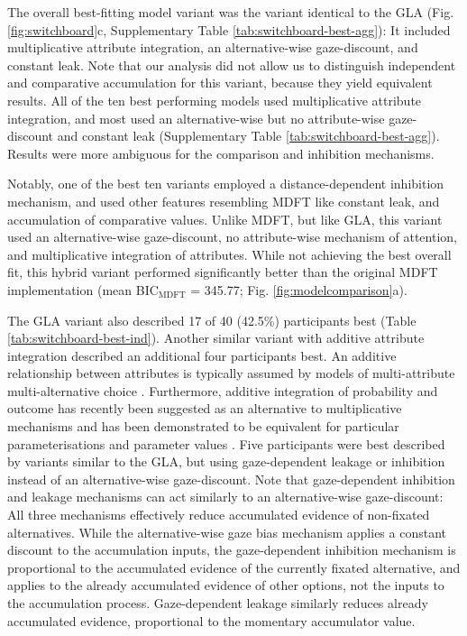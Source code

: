 \documentclass[11pt, a4paper]{article}
\begin{document}
The overall best-fitting model variant was the variant identical to the GLA (Fig. \ref{fig:switchboard}c, Supplementary Table \ref{tab:switchboard-best-agg}): It included multiplicative attribute integration, an alternative-wise gaze-discount, and constant leak. Note that our analysis did not allow us to distinguish independent and comparative accumulation for this variant, because they yield equivalent results. All of the ten best performing models used multiplicative attribute integration, and most used an alternative-wise but no attribute-wise gaze-discount and constant leak (Supplementary Table \ref{tab:switchboard-best-agg}). Results were more ambiguous for the comparison and inhibition mechanisms.

Notably, one of the best ten variants employed a distance-dependent inhibition mechanism, and used other features resembling MDFT like constant leak, and accumulation of comparative values. Unlike MDFT, but like GLA, this variant used an alternative-wise gaze-discount, no attribute-wise mechanism of attention, and multiplicative integration of attributes. While not achieving the best overall fit, this hybrid variant performed significantly better than the original MDFT implementation (mean BIC$_{\text{MDFT}}$ = 345.77; Fig. \ref{fig:modelcomparison}a).

The GLA variant also described 17 of 40 (42.5\%) participants best (Table \ref{tab:switchboard-best-ind}). Another similar variant with additive attribute integration described an additional four participants best. An additive relationship between attributes is typically assumed by models of multi-attribute multi-alternative choice \parencite[e.g.,][]{roe2001MultialternativeDecisionField,usher2004LossAversionInhibition}. Furthermore, additive integration of probability and outcome has recently been suggested as an alternative to multiplicative mechanisms and has been demonstrated to be equivalent for particular parameterisations and parameter values \parencite{rouault2019PrefrontalMechanismsCombining}. Five participants were best described by variants similar to the GLA, but using gaze-dependent leakage or inhibition instead of an alternative-wise gaze-discount. Note that gaze-dependent inhibition and leakage mechanisms can act similarly to an alternative-wise gaze-discount: All three mechanisms effectively reduce accumulated evidence of non-fixated alternatives. While the alternative-wise gaze bias mechanism applies a constant discount to the accumulation inputs, the gaze-dependent inhibition mechanism is proportional to the accumulated evidence of the currently fixated alternative, and applies to the already accumulated evidence of other options, not the inputs to the accumulation process. Gaze-dependent leakage similarly reduces already accumulated evidence, proportional to the momentary accumulator value.
\end{document}
